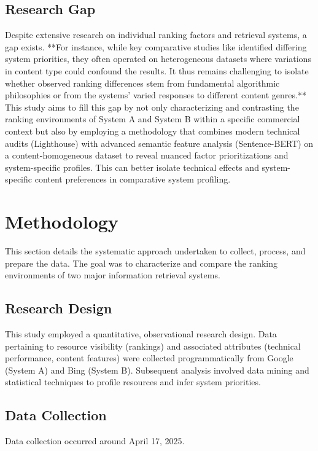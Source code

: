 \documentclass[a4paper,fleqn]{cas-sc}
\begin{document}
\subsection{Research Gap}
\label{subsec:lit_gap}
Despite extensive research on individual ranking factors and retrieval systems, a gap exists. **For instance, while key comparative studies like \citet{Toms2004} identified differing system priorities, they often operated on heterogeneous datasets where variations in content type could confound the results. It thus remains challenging to isolate whether observed ranking differences stem from fundamental algorithmic philosophies or from the systems' varied responses to different content genres.** This study aims to fill this gap by not only characterizing and contrasting the ranking environments of System A and System B within a specific commercial context but also by employing a methodology that combines modern technical audits (Lighthouse) with advanced semantic feature analysis (Sentence-BERT) on a content-homogeneous dataset to reveal nuanced factor prioritizations and system-specific profiles. This can better isolate technical effects and system-specific content preferences in comparative system profiling.

\section{Methodology}
\label{sec:methodology}
This section details the systematic approach undertaken to collect, process, and prepare the data. The goal was to characterize and compare the ranking environments of two major information retrieval systems.

\subsection{Research Design}
\label{subsec:design}
This study employed a quantitative, observational research design. Data pertaining to resource visibility (rankings) and associated attributes (technical performance, content features) were collected programmatically from Google (System A) and Bing (System B). Subsequent analysis involved data mining and statistical techniques to profile resources and infer system priorities.

\subsection{Data Collection}
\label{subsec:collection}
Data collection occurred around April 17, 2025.
\end{document}
